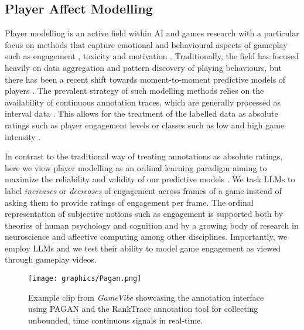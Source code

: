 \subsection{Player Affect Modelling}

Player modelling is an active field within AI and games research \cite{yannakakis2018artificial} with a particular focus on methods that capture emotional and behavioural aspects of gameplay such as engagement \cite{melhart2020moment}, toxicity \cite{canossa2021honor} and motivation \cite{melhart2019your}. Traditionally, the field has focused heavily on data aggregation \cite{el2016game} and pattern discovery \cite{makarovych2018like, melhart2019your} of playing behaviours, but there has been a recent shift towards moment-to-moment predictive models of players 
\cite{makantasis2021privileged,melhart2020moment,melhart2021towards,booth2024people,barthet2024gamevibe}. The prevalent strategy of such modelling methods relies on the availability of continuous annotation traces, which are generally processed as interval data \cite{yannakakis2018ordinal}. This allows for the treatment of the labelled data as absolute ratings such as player engagement levels or classes such as low and high game intensity \cite{booth2024people,makantasis2021privileged}.

In contrast to the traditional way of treating annotations as absolute ratings, here we view player modelling as an ordinal learning paradigm aiming to maximize the reliability and validity of our predictive models \cite{yannakakis2018ordinal,yannakakis2017ordinal}. We task LLMs to label \emph{increases} or \emph{decreases} of engagement across frames of a game instead of asking them to provide ratings of engagement per frame. The ordinal representation of subjective notions such as engagement is supported both by theories of human psychology and cognition \cite{helson1964current,solomon1974opponent} and by a growing body of research in neuroscience \cite{damasio1996somatic} and affective computing \cite{yannakakis2015grounding,lotfian2016practical,yannakakis2018ordinal,melhart2020study,melhart2021towards,barthet2024gamevibe} among other disciplines. Importantly, we employ LLMs and we test their ability to model game engagement as viewed through gameplay videos. 


\begin{figure}[t]
\centering
\texttt{[image: graphics/Pagan.png]}
\label{fig:pagan}
\caption{Example clip from \emph{GameVibe} showcasing the annotation interface using PAGAN and the RankTrace annotation tool for collecting unbounded, time continuous signals in real-time.}
\end{figure}